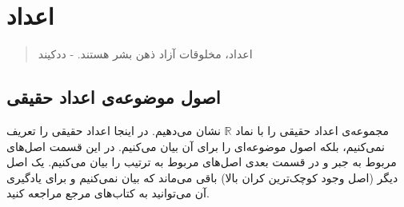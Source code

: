 \chapter{اعداد}
\thispagestyle{empty}

\begin{quote}
	{\lotus
		اعداد، مخلوقات آزاد ذهن بشر هستند. \quad - ددکیند%
	}
\end{quote}

\section{اصول موضوعه‌ی اعداد حقیقی}
مجموعه‌ی اعداد حقیقی را با نماد
$\mathbb{R}$
نشان می‌دهیم. در اینجا اعداد حقیقی را تعریف نمی‌کنیم، بلکه اصول موضوعه‌ای را برای آن بیان می‌کنیم. در این قسمت اصل‌های مربوط به جبر و در قسمت بعدی اصل‌های مربوط به ترتیب را بیان می‌کنیم. یک اصل دیگر (اصل وجود کوچک‌ترین کران بالا) باقی می‌ماند که بیان نمی‌کنیم و برای یادگیری آن می‌توانید به کتاب‌های مرجع مراجعه کنید.

